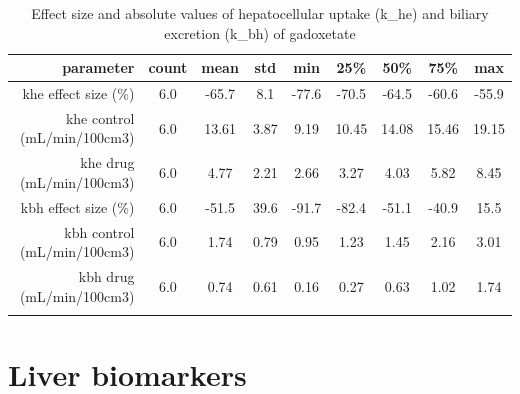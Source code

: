 \documentclass{epflreport}%
\begin{document}
%
\begin{longtable}{rcccccccc}%
\hline%
parameter&count&mean&std&min&25\%&50\%&75\%&max\\%
\hline%
khe effect size (\%)&6.0&{-}65.7&8.1&{-}77.6&{-}70.5&{-}64.5&{-}60.6&{-}55.9\\%
khe control (mL/min/100cm3)&6.0&13.61&3.87&9.19&10.45&14.08&15.46&19.15\\%
khe drug (mL/min/100cm3)&6.0&4.77&2.21&2.66&3.27&4.03&5.82&8.45\\%
kbh effect size (\%)&6.0&{-}51.5&39.6&{-}91.7&{-}82.4&{-}51.1&{-}40.9&15.5\\%
kbh control (mL/min/100cm3)&6.0&1.74&0.79&0.95&1.23&1.45&2.16&3.01\\%
kbh drug (mL/min/100cm3)&6.0&0.74&0.61&0.16&0.27&0.63&1.02&1.74\\%
\hline%
\caption{Effect size and absolute values of hepatocellular uptake (k\_he) and biliary excretion (k\_bh) of gadoxetate} \\%
\end{longtable}%
\clearpage%
\section{Liver biomarkers}%
\label{sec:Liverbiomarkers}%
\end{document}
